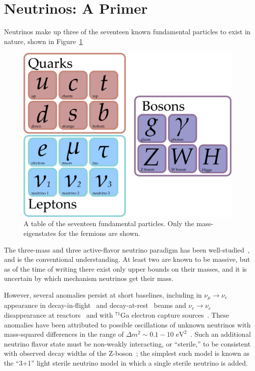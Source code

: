 \documentclass[main.tex]{subfiles}
\begin{document}
\section{Neutrinos: A Primer}
Neutrinos make up three of the seventeen known fundamental particles to exist in nature, shown in Figure~\ref{fig:party}
\begin{figure}
    \centering
    \includegraphics[width=0.8\linewidth]{figures/particles.png}
    \caption{A table of the seventeen fundamental particles. Only the mass-eigenstates for the fermions are shown.}\label{fig:party}
\end{figure}
The three-mass and three active-flavor neutrino  paradigm has been well-studied~\cite{PhysRevD.98.030001,Esteban_2019,de_Salas_2018,Capozzi_2016,zboson2006, berns2021recent}, and is the conventional understanding.
At least two are known to be massive, but as of the time of writing there exist only upper bounds on their masses, and it is uncertain by which mechanism neutrinos get their mass.

However, several anomalies persist at short baselines, including in $\nu_\mu\rightarrow\nu_e $ appearance in decay-in-flight~\cite{aguilar2018significant} and decay-at-rest~\cite{Athanassopoulos_1998} beams  and $\nu_e\rightarrow\nu_e$ disappearance at reactors~\cite{mention2011reactor,serebrov2019first}  and with $^{71}$Ga electron capture sources~\cite{PhysRevC.73.045805,giunti2011statistical}.  
These anomalies have been attributed to possible oscillations of unknown neutrinos with mass-squared differences in the range of $\Delta m^{2}\sim 0.1-10\text{ eV}^{2}$~\cite{abazajian2012light}.   
Such an additional neutrino flavor state must be non-weakly interacting, or ``sterile,'' to be consistent with observed decay widths of the Z-boson~\cite{zboson2006}; the simplest such model is known as the ``3+1'' light sterile neutrino model in which a single sterile neutrino is added. 
\end{document}

